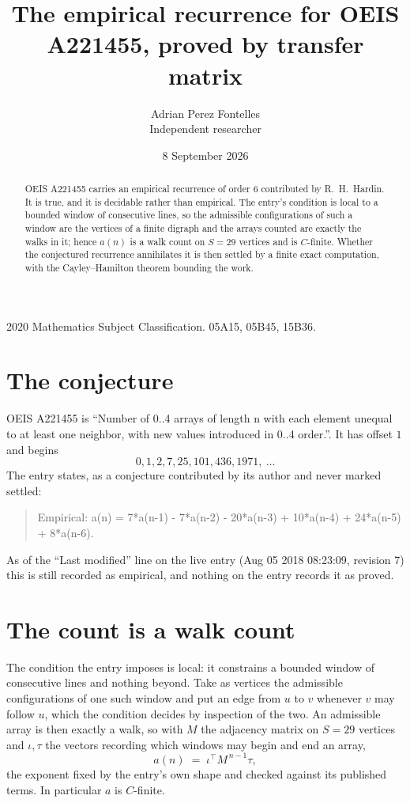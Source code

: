 \documentclass[11pt,a4paper]{article}
\title{The empirical recurrence for OEIS A221455, proved by transfer matrix}
\author{Adrian Perez Fontelles\\ \small Independent researcher}
\date{8 September 2026}
\theoremstyle{plain}
\theoremstyle{definition}
\begin{document}
\maketitle

\begin{abstract}
OEIS A221455 carries an empirical recurrence of order $6$ contributed by R.~H.~Hardin. It is
true, and it is decidable rather than empirical. The entry's condition is local to a bounded window of consecutive lines, so
the admissible configurations of such a window are the vertices of a finite digraph and the
arrays counted are exactly the walks in it; hence $a(n)$ is a walk count on $S=29$ vertices
and is $C$-finite. Whether the conjectured recurrence annihilates it is then settled by a
finite exact computation, with the Cayley--Hamilton theorem bounding the work.
\end{abstract}

\noindent\small 2020 Mathematics Subject Classification. 05A15, 05B45, 15B36.\normalsize

\section{The conjecture}

OEIS A221455 is ``Number of 0..4 arrays of length n with each element unequal to at least one neighbor, with new values introduced in 0..4 order.''. It has offset $1$ and begins
\[
0, 1, 2, 7, 25, 101, 436, 1971,\ \dots
\]
The entry states, as a conjecture contributed by its author and never marked settled:
\begin{quote}
Empirical: a(n) = 7*a(n-1) - 7*a(n-2) - 20*a(n-3) + 10*a(n-4) + 24*a(n-5) + 8*a(n-6).
\end{quote}
As of the ``Last modified'' line on the live entry (Aug 05 2018 08:23:09, revision 7) this is still
recorded as empirical, and nothing on the entry records it as proved.

\section{The count is a walk count}

The condition the entry imposes is local: it constrains a bounded window of consecutive lines and nothing beyond. Take as
vertices the admissible configurations of one such window and put an edge from $u$ to $v$
whenever $v$ may follow $u$, which the condition decides by inspection of the two. An
admissible array is then exactly a walk, so with $M$ the adjacency matrix on $S=29$ vertices
and $\iota,\tau$ the vectors recording which windows may begin and end an array,
\[
a(n)\;=\;\iota^{\!\top}M^{\,n-1}\tau ,
\]
the exponent fixed by the entry's own shape and checked against its published terms. In
particular $a$ is $C$-finite.
\end{document}
